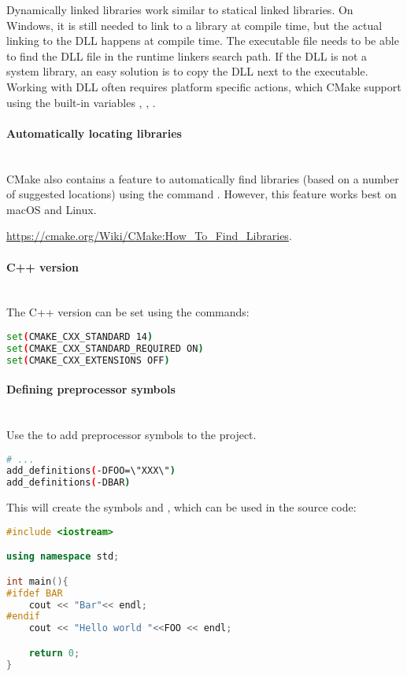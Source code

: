 \documentclass[11pt,a4paper,landscape]{scrartcl} %
\newcommand{\sectiontitle}[1]{\paragraph{#1} \ \\} %
\begin{document}
\begin{multicols}{2}


Dynamically linked libraries work similar to statical linked libraries. On Windows, it is still needed to link to a library at compile time, but the actual linking to the DLL happens at compile time. The executable file needs to be able to find the DLL file in the runtime linkers search path. If the DLL is not a system library, an easy solution is to copy the DLL next to the executable. Working with DLL often requires platform specific actions, which CMake support using the built-in variables , , .



\sectiontitle{Automatically locating libraries}

CMake also contains a feature to automatically find libraries (based on a number of suggested locations) using the command . However, this feature works best on macOS and Linux. 

\url{https://cmake.org/Wiki/CMake:How_To_Find_Libraries}.

\sectiontitle{C++ version}

The C++ version can be set using the commands:

\begin{lstlisting}[language=bash]
set(CMAKE_CXX_STANDARD 14)
set(CMAKE_CXX_STANDARD_REQUIRED ON)
set(CMAKE_CXX_EXTENSIONS OFF)
\end{lstlisting}

\sectiontitle{Defining preprocessor symbols}

Use the  to add preprocessor symbols to the project.

\begin{lstlisting}[language=bash]
# ...
add_definitions(-DFOO=\"XXX\")
add_definitions(-DBAR)
\end{lstlisting}

This will create the symbols  and , which can be used in the source code:

\begin{lstlisting}[language=c++]
#include <iostream>

using namespace std;

int main(){
#ifdef BAR
    cout << "Bar"<< endl;
#endif
    cout << "Hello world "<<FOO << endl;

    return 0;
}
\end{lstlisting}


\end{multicols}
\end{document}
